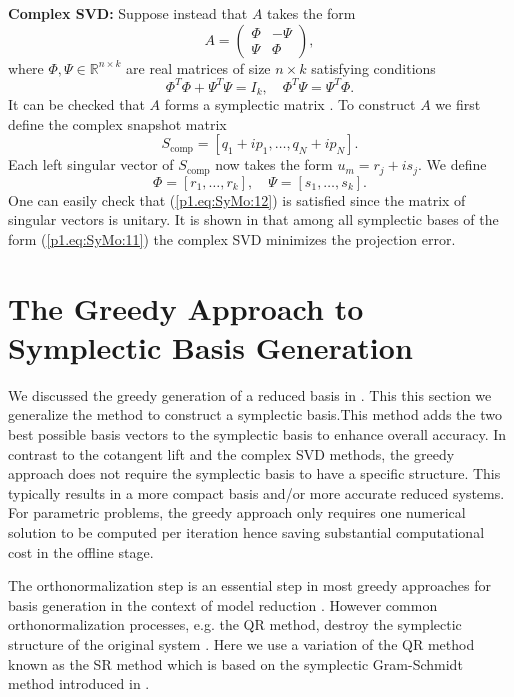 {\bf Complex SVD:} Suppose instead that $A$ takes the form 
\begin{equation} \label{p1.eq:SyMo:11}
	A = 
	\begin{pmatrix}
		\Phi & -\Psi \\
		\Psi & \Phi
	\end{pmatrix},
\end{equation}
where $\Phi,\Psi\in \mathbb R^{n\times k}$ are real matrices of size $n\times k$ satisfying conditions
\begin{equation} \label{p1.eq:SyMo:12}
\Phi^T \Phi + \Psi^T \Psi = I_k,\quad \Phi^T \Psi = \Psi^T \Phi.
\end{equation}
It can be checked that $A$ forms a symplectic matrix \cite{marsden2013introduction}. To construct $A$ we first define the complex snapshot matrix
\begin{equation} \label{p1.eq:SyMo:13}
	S_{\text{comp}} = [ q_1 + i p_1, \dots , q_N + i p_N ].
\end{equation}
Each left singular vector of $S_{\text{comp}}$ now takes the form $u_m = r_j + i s_j$. We define
\begin{equation} \label{p1.eq:SyMo:14}
	 \Phi = [r_1,\dots, r_k], \quad \Psi = [s_1,\dots, s_k].
\end{equation}
One can easily check that (\ref{p1.eq:SyMo:12}) is satisfied since the matrix of singular vectors is unitary. It is shown in \cite{doi:10.1137/140978922} that among all symplectic bases of the form (\ref{p1.eq:SyMo:11}) the complex SVD minimizes the projection error.


\section{The Greedy Approach to Symplectic Basis Generation} \label{p1.Chap:Symo.PrSy:3} We discussed the greedy generation of a reduced basis in . This this section we generalize the method to construct a symplectic basis.This method adds the two best possible basis vectors to the symplectic basis to enhance overall accuracy. In contrast to the cotangent lift and the complex SVD methods, the greedy approach does not require the symplectic basis to have a specific structure. This typically results in a more compact basis and/or more accurate reduced systems. For parametric problems, the greedy approach only requires one numerical solution to be computed per iteration hence saving substantial computational cost in the offline stage. 

The orthonormalization step is an essential step in most greedy approaches for basis generation in the context of model reduction \cite{hesthaven2015certified,quarteroni2015reduced}. However common orthonormalization processes, e.g. the QR method, destroy the symplectic structure of the original system \cite{bunse1986matrix}. Here we use a variation of the QR method known as the SR \cite{Salam2014} method which is based on the symplectic Gram-Schmidt method introduced in .

